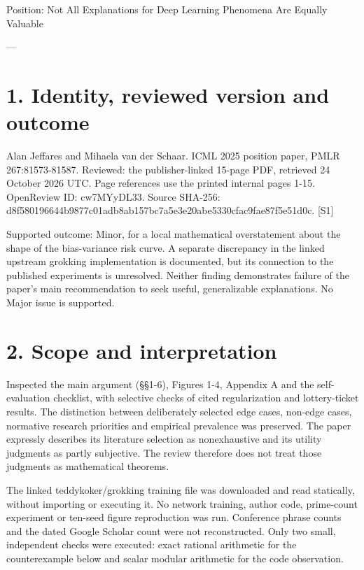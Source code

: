 \documentclass[10pt]{article}
\begin{document}
Position: Not All Explanations for Deep Learning Phenomena Are Equally Valuable\par
---\par
\section*{1. Identity, reviewed version and outcome}
Alan Jeffares and Mihaela van der Schaar. ICML 2025 position paper, PMLR 267:81573-81587. Reviewed: the publisher-linked 15-page PDF, retrieved 24 October 2026 UTC. Page references use the printed internal pages 1-15. OpenReview ID: cw7MYyDL33. Source SHA-256: d8f580196644b9877c01adb8ab157bc7a5e3e20abe5330cfac9fae87f5e51d0c. [S1]\par
Supported outcome: Minor, for a local mathematical overstatement about the shape of the bias-variance risk curve. A separate discrepancy in the linked upstream grokking implementation is documented, but its connection to the published experiments is unresolved. Neither finding demonstrates failure of the paper’s main recommendation to seek useful, generalizable explanations. No Major issue is supported.\par
\section*{2. Scope and interpretation}
Inspected the main argument (§§1-6), Figures 1-4, Appendix A and the self-evaluation checklist, with selective checks of cited regularization and lottery-ticket results. The distinction between deliberately selected edge cases, non-edge cases, normative research priorities and empirical prevalence was preserved. The paper expressly describes its literature selection as nonexhaustive and its utility judgments as partly subjective. The review therefore does not treat those judgments as mathematical theorems.\par
The linked teddykoker/grokking training file was downloaded and read statically, without importing or executing it. No network training, author code, prime-count experiment or ten-seed figure reproduction was run. Conference phrase counts and the dated Google Scholar count were not reconstructed. Only two small, independent checks were executed: exact rational arithmetic for the counterexample below and scalar modular arithmetic for the code observation.\par
\end{document}
